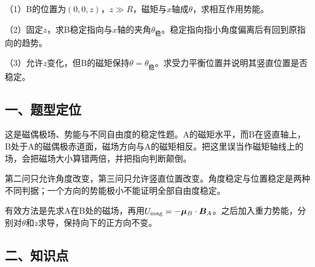 \documentclass[12pt,a4paper,fontset=fandol]{ctexart}
\begin{document}
\begin{center}
\begin{minipage}{\linewidth}
\centering\begingroup{}
\ifdim\wd\diagrambox>.88\linewidth
\sbox{\diagrambox}{\resizebox{.88\linewidth}{!}{\usebox{\diagrambox}}}\fi
\ifdim\ht\diagrambox>.38\textheight
\resizebox{!}{.38\textheight}{\usebox{\diagrambox}}
\else\usebox{\diagrambox}\fi
\par{}\endgroup\end{minipage}\end{center}

（1）B的位置为\((0,0,z)\)，\(z\gg R\)，磁矩与\(x\)轴成\(\theta\)，求相互作用势能。

（2）固定\(z\)，求B稳定指向与\(x\)轴的夹角\(\theta_{\text{稳}}\)。稳定指向指小角度偏离后有回到原指向的趋势。

（3）允许\(z\)变化，但B的磁矩保持\(\theta=\theta_{\text{稳}}\)。求受力平衡位置并说明其竖直位置是否稳定。

\subsection{一、题型定位}\label{ux4e00ux9898ux578bux5b9aux4f4d-3}

这是磁偶极场、势能与不同自由度的稳定性题。A的磁矩水平，而B在竖直轴上，B处于A的磁偶极赤道面，磁场方向与A的磁矩相反。把这里误当作磁矩轴线上的场，会把磁场大小算错两倍，并把指向判断颠倒。

第二问只允许角度改变，第三问只允许竖直位置改变。角度稳定与位置稳定是两种不同判据；一个方向的势能极小不能证明全部自由度稳定。

有效方法是先求A在B处的磁场，再用\(U_{\rm mag}=-\boldsymbol\mu_B\cdot\boldsymbol B_A\)。之后加入重力势能，分别对\(\theta\)和\(z\)求导，保持向下的正方向不变。

\subsection{二、知识点}\label{ux4e8cux77e5ux8bc6ux70b9-3}
\end{document}
